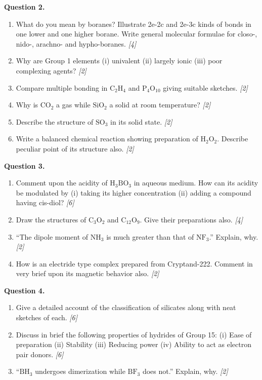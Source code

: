 \documentclass[11pt,a4paper]{article}
\newcommand{\pts}[1]{\hfill \textit{[#1]}}
\begin{document}
\bigskip

\noindent \textbf{Question 2.}
\begin{enumerate}[label=(\alph*)]
  \item What do you mean by boranes? Illustrate 2e-2c and 2e-3c kinds of bonds in one lower and one higher borane. Write general molecular formulae for closo-, nido-, arachno- and hypho-boranes. \pts{4}
  \item Why are Group 1 elements (i) univalent (ii) largely ionic (iii) poor complexing agents? \pts{2}
  \item Compare multiple bonding in $\text{C}_2\text{H}_4$ and $\text{P}_4\text{O}_{10}$ giving suitable sketches. \pts{2}
  \item Why is $\text{CO}_2$ a gas while $\text{SiO}_2$ a solid at room temperature? \pts{2}
  \item Describe the structure of $\text{SO}_3$ in its solid state. \pts{2}
  \item Write a balanced chemical reaction showing preparation of $\text{H}_2\text{O}_2$. Describe peculiar point of its structure also. \pts{2}
\end{enumerate}

\bigskip

\noindent \textbf{Question 3.}
\begin{enumerate}[label=(\alph*)]
  \item Comment upon the acidity of $\text{H}_3\text{BO}_3$ in aqueous medium. How can its acidity be modulated by (i) taking its higher concentration (ii) adding a compound having cis-diol? \pts{6}
  \item Draw the structures of $\text{C}_3\text{O}_2$ and $\text{C}_{12}\text{O}_9$. Give their preparations also. \pts{4}
  \item ``The dipole moment of $\text{NH}_3$ is much greater than that of $\text{NF}_3$.'' Explain, why. \pts{2}
  \item How is an electride type complex prepared from Cryptand-222. Comment in very brief upon its magnetic behavior also. \pts{2}
\end{enumerate}

\bigskip

\noindent \textbf{Question 4.}
\begin{enumerate}[label=(\alph*)]
  \item Give a detailed account of the classification of silicates along with neat sketches of each. \pts{6}
  \item Discuss in brief the following properties of hydrides of Group 15: (i) Ease of preparation (ii) Stability (iii) Reducing power (iv) Ability to act as electron pair donors. \pts{6}
  \item ``$\text{BH}_3$ undergoes dimerization while $\text{BF}_3$ does not.'' Explain, why. \pts{2}
\end{enumerate}
\end{document}
